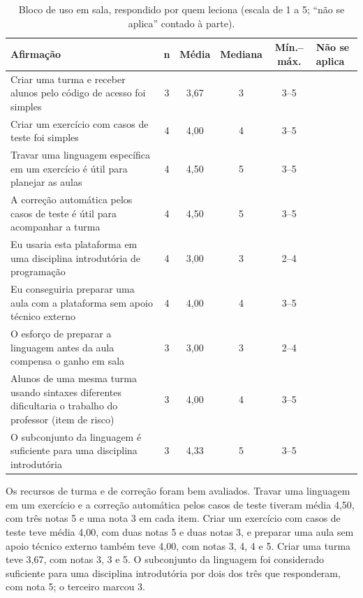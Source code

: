 \begin{table}[htbp]
\centering
\caption{Bloco de uso em sala, respondido por quem leciona (escala de 1 a 5; ``não se aplica'' contado à parte).}
\label{tab:resultado-ava}
\footnotesize
\renewcommand{\arraystretch}{1.2}
\begin{tabular}{|p{7.8cm}|c|c|c|c|p{1.4cm}|}
\hline
\textbf{Afirmação} & \textbf{n} & \textbf{Média} & \textbf{Mediana} & \textbf{Mín.--máx.} & \textbf{Não se aplica} \\\hline
Criar uma turma e receber alunos pelo código de acesso foi simples & 3 & 3,67 & 3 & 3--5 & \centering\arraybackslash 1 \\\hline
Criar um exercício com casos de teste foi simples & 4 & 4,00 & 4 & 3--5 & \centering\arraybackslash 0 \\\hline
Travar uma linguagem específica em um exercício é útil para planejar as aulas & 4 & 4,50 & 5 & 3--5 & \centering\arraybackslash 0 \\\hline
A correção automática pelos casos de teste é útil para acompanhar a turma & 4 & 4,50 & 5 & 3--5 & \centering\arraybackslash 0 \\\hline
Eu usaria esta plataforma em uma disciplina introdutória de programação & 4 & 3,00 & 3 & 2--4 & \centering\arraybackslash 0 \\\hline
Eu conseguiria preparar uma aula com a plataforma sem apoio técnico externo & 4 & 4,00 & 4 & 3--5 & \centering\arraybackslash 0 \\\hline
O esforço de preparar a linguagem antes da aula compensa o ganho em sala & 3 & 3,00 & 3 & 2--4 & \centering\arraybackslash 1 \\\hline
Alunos de uma mesma turma usando sintaxes diferentes dificultaria o trabalho do professor (item de risco) & 3 & 4,00 & 4 & 3--5 & \centering\arraybackslash 1 \\\hline
O subconjunto da linguagem é suficiente para uma disciplina introdutória & 3 & 4,33 & 5 & 3--5 & \centering\arraybackslash 1 \\\hline
\end{tabular}
\end{table}

Os recursos de turma e de correção foram bem avaliados. Travar uma linguagem em um exercício e a correção automática pelos casos de teste tiveram média 4,50, com três notas 5 e uma nota 3 em cada item. Criar um exercício com casos de teste teve média 4,00, com duas notas 5 e duas notas 3, e preparar uma aula sem apoio técnico externo também teve 4,00, com notas 3, 4, 4 e 5. Criar uma turma teve 3,67, com notas 3, 3 e 5. O subconjunto da linguagem foi considerado suficiente para uma disciplina introdutória por dois dos três que responderam, com nota 5; o terceiro marcou 3.

